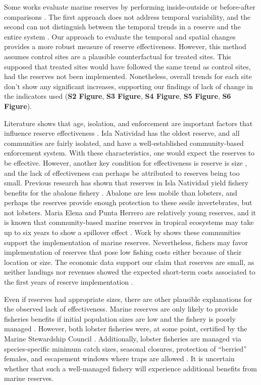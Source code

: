 \documentclass{frontiersSCNS}
\begin{document}
Some works evaluate marine reserves by performing inside-outside
\citep{guidetti_2014-8Z,friedlander_2017-oI,rodriguez_2017-PD} or
before-after comparisons \citep{betti_2017-lq}. The first approach does
not address temporal variability, and the second can not distinguish
between the temporal trends in a reserve and the entire system
\citep{depalma_2018}. Our approach to evaluate the temporal and spatial
changes provides a more robust measure of reserve effectiveness.
However, this method assumes control sites are a plausible
counterfactual for treated sites. This supposed that treated sites would
have followed the same trend as control sites, had the reserves not been
implemented. Nonetheless, overall trends for each site don't show any
significant increases, supporting our findings of lack of change in the
indicators used (\textbf{S2 Figure}, \textbf{S3 Figure}, \textbf{S4
Figure}, \textbf{S5 Figure}, \textbf{S6 Figure}).

Literature shows that age, isolation, and enforcement are important
factors that influence reserve effectiveness \citep{edgar_2014-UO}. Isla
Natividad has the oldest reserve, and all communities are fairly
isolated, and have a well-established community-based enforcement
system. With these characteristics, one would expect the reserves to be
effective. However, another key condition for effectiveness is reserve
is size \citep{edgar_2014-UO}, and the lack of effectiveness can perhaps
be attributed to reserves being too small. Previous research has shown
that reserves in Isla Natividad yield fishery benefits for the abalone
fishery \citep{rossetto_2015-V0}. Abalone are less mobile than lobsters,
and perhaps the reserves provide enough protection to these sesile
invertebrates, but not lobsters. Maria Elena and Punta Herrero are
relatively young reserves, and it is known that community-based marine
reserves in tropical ecosystems may take up to six years to show a
spillover effect \citep{dasilva_2015-zX}. Work by \citet{ayer_2018}
shows these communities support the implementation of marine reserves.
Nevertheless, fishers may favor implementation of reserves that pose low
fishing costs either because of their location or size. The economic
data support our claim that reserves are small, as neither landings nor
revenues showed the expected short-term costs associated to the first
years of reserve implementation \citep{ovando_2016-Wg}.

Even if reserves had appropriate sizes, there are other plausible
explanations for the observed lack of effectiveness. Marine reserves are
only likely to provide fisheries benefits if initial population sizes
are low and the fishery is poorly managed \citep{hilborn_2006}. However,
both lobster fisheries were, at some point, certified by the Marine
Stewardship Council \citep{prezramrez_2016-J1}. Additionally, lobster
fisheries are managed via species-specific minimum catch sizes, seasonal
closures, protection of ``berried'' females, and escapement windows
where traps are allowed \cite{dof_website_1993}. It is uncertain whether
that such a well-managed fishery will experience additional benefits
from marine reserves.
\end{document}
